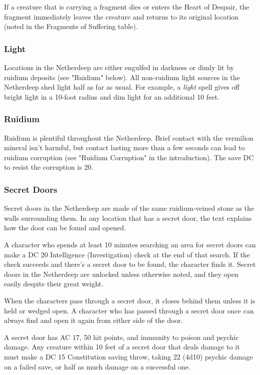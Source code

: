 \documentclass[10pt,a4paper,twoside,fancy,bg=print,twocolumn,openany,nodeprecatedcode]{dndbook}
\begin{document}
If a creature that is carrying a fragment dies or enters the Heart of Despair, the fragment immediately leaves the creature and returns to its original location (noted in the Fragments of Suffering table).

\subsubsection{Light}
Locations in the Netherdeep are either engulfed in darkness or dimly lit by ruidium deposits (see "Ruidium" below). All non-ruidium light sources in the Netherdeep shed light half as far as usual. For example, a \textit{light} spell gives off bright light in a 10-foot radius and dim light for an additional 10 feet.

\subsubsection{Ruidium}
Ruidium is plentiful throughout the Netherdeep. Brief contact with the vermilion mineral isn't harmful, but contact lasting more than a few seconds can lead to ruidium corruption (see "Ruidium Corruption" in the introduction). The save DC to resist the corruption is 20.

\subsubsection{Secret Doors}
Secret doors in the Netherdeep are made of the same ruidium-veined stone as the walls surrounding them. In any location that has a secret door, the text explains how the door can be found and opened.

A character who spends at least 10 minutes searching an area for secret doors can make a DC 20 Intelligence (Investigation) check at the end of that search. If the check succeeds and there's a secret door to be found, the character finds it. Secret doors in the Netherdeep are unlocked unless otherwise noted, and they open easily despite their great weight.

When the characters pass through a secret door, it closes behind them unless it is held or wedged open. A character who has passed through a secret door once can always find and open it again from either side of the door.

A secret door has AC 17, 50 hit points, and immunity to poison and psychic damage. Any creature within 10 feet of a secret door that deals damage to it must make a DC 15 Constitution saving throw, taking 22 (4d10) psychic damage on a failed save, or half as much damage on a successful one.
\end{document}

